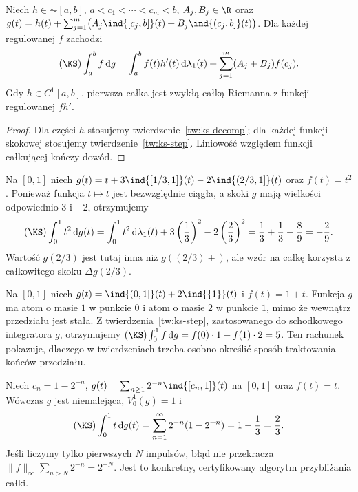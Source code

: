 \begin{wniosek}
\label{wn:ks-ac-jumps}
Niech $h\in\AC[a,b]$, $a<c_1<\cdots<c_m<b$, $A_j,B_j\in\R$ oraz
$g(t)=h(t)+\sum_{j=1}^m\bigl(A_j\ind{[c_j,b]}(t)+B_j\ind{(c_j,b]}(t)\bigr)$. Dla każdej regulowanej $f$ zachodzi
\[
 (\KS)\int_a^b f\,\mathrm dg
 =\int_a^b f(t)h'(t)\,\mathrm d\lambda_1(t)
 +\sum_{j=1}^m(A_j+B_j)f(c_j).
\]
Gdy $h\in C^1[a,b]$, pierwsza całka jest zwykłą całką Riemanna z funkcji regulowanej $fh'$.
\end{wniosek}
\begin{proof}
Dla części $h$ stosujemy twierdzenie~\ref{tw:ks-decomp}; dla każdej funkcji skokowej stosujemy twierdzenie~\ref{tw:ks-step}. Liniowość względem funkcji całkującej kończy dowód.
\end{proof}

\begin{przyklad}
Na $[0,1]$ niech $g(t)=t+3\ind{[1/3,1]}(t)-2\ind{(2/3,1]}(t)$ oraz $f(t)=t^2$. Ponieważ funkcja $t\mapsto t$ jest bezwzględnie ciągła, a skoki $g$ mają wielkości odpowiednio $3$ i $-2$, otrzymujemy
\[
 (\KS)\int_0^1 t^2\,\mathrm dg(t)
 =\int_0^1 t^2\,\mathrm d\lambda_1(t)
 +3\left(\frac13\right)^2-2\left(\frac23\right)^2
 =\frac13+\frac13-\frac89=-\frac29.
\]
Wartość $g(2/3)$ jest tutaj inna niż $g((2/3)+)$, ale wzór na całkę korzysta z całkowitego skoku $\Delta g(2/3)$.
\end{przyklad}

\begin{przyklad}
Na $[0,1]$ niech $g(t)=\ind{(0,1]}(t)+2\ind{\{1\}}(t)$ i $f(t)=1+t$. Funkcja $g$ ma atom o masie $1$ w punkcie $0$ i atom o masie $2$ w punkcie $1$, mimo że wewnątrz przedziału jest stała. Z twierdzenia~\ref{tw:ks-step}, zastosowanego do schodkowego integratora $g$, otrzymujemy
$(\KS)\int_0^1 f\,\mathrm dg=f(0)\cdot1+f(1)\cdot2=5$.
Ten rachunek pokazuje, dlaczego w twierdzeniach trzeba osobno określić sposób traktowania końców przedziału.
\end{przyklad}

\begin{przyklad}
Niech $c_n=1-2^{-n}$, $g(t)=\sum_{n\ge1}2^{-n}\ind{[c_n,1]}(t)$ na $[0,1]$ oraz $f(t)=t$. Wówczas $g$ jest niemalejąca, $V_0^1(g)=1$ i
\[
 (\KS)\int_0^1 t\,\mathrm dg(t)
 =\sum_{n=1}^\infty2^{-n}(1-2^{-n})
 =1-\frac13=\frac23.
\]
Jeśli liczymy tylko pierwszych $N$ impulsów, błąd nie przekracza $\|f\|_\infty\sum_{n>N}2^{-n}=2^{-N}$. Jest to konkretny, certyfikowany algorytm przybliżania całki.
\end{przyklad}

